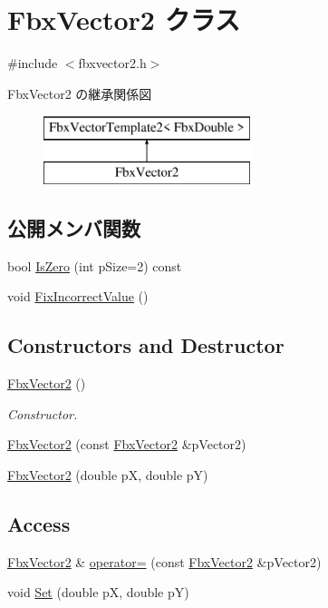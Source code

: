 \hypertarget{class_fbx_vector2}{}\section{Fbx\+Vector2 クラス}
\label{class_fbx_vector2}


{\ttfamily \#include $<$fbxvector2.\+h$>$}

Fbx\+Vector2 の継承関係図\begin{figure}[H]
\begin{center}
\leavevmode
\includegraphics[height=2.000000cm]{class_fbx_vector2}
\end{center}
\end{figure}
\subsection*{公開メンバ関数}
\begin{DoxyCompactItemize}
\item 
bool \hyperlink{class_fbx_vector2_ae98104ed051bcace69d39d459c39bae4}{Is\+Zero} (int p\+Size=2) const
\item 
void \hyperlink{class_fbx_vector2_a1045bf41d94e9bce617163959fae50ba}{Fix\+Incorrect\+Value} ()
\end{DoxyCompactItemize}
\subsection*{Constructors and Destructor}
\begin{DoxyCompactItemize}
\item 
\hyperlink{class_fbx_vector2_afb0716473e400a06bd41f337d5d9d8d2}{Fbx\+Vector2} ()
\begin{DoxyCompactList}\small\item\em Constructor. \end{DoxyCompactList}\item 
\hyperlink{class_fbx_vector2_ae3e34456e4fbf24627590da182d3489f}{Fbx\+Vector2} (const \hyperlink{class_fbx_vector2}{Fbx\+Vector2} \&p\+Vector2)
\item 
\hyperlink{class_fbx_vector2_ae2d1e80f75a1566de936cfa8532a49b3}{Fbx\+Vector2} (double pX, double pY)
\end{DoxyCompactItemize}
\subsection*{Access}
\begin{DoxyCompactItemize}
\item 
\hyperlink{class_fbx_vector2}{Fbx\+Vector2} \& \hyperlink{class_fbx_vector2_a1133cfe1028a4e62ce6dceb579fd8450}{operator=} (const \hyperlink{class_fbx_vector2}{Fbx\+Vector2} \&p\+Vector2)
\item 
void \hyperlink{class_fbx_vector2_a3a28093a354342dcf424cab26f732a57}{Set} (double pX, double pY)
\end{DoxyCompactItemize}
